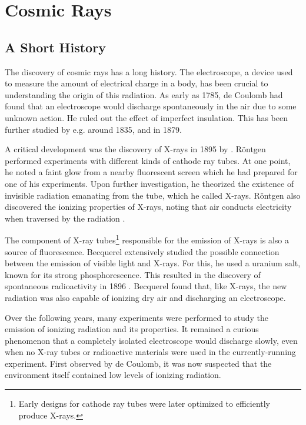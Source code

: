 \chapter{Cosmic Rays}

\section{A Short History}

The discovery of cosmic rays has a long history.  The electroscope, a device
used to measure the amount of electrical charge in a body, has been crucial to
understanding the origin of this radiation.
As early as 1785, de Coulomb \cite{deCoulomb:1785} had found that an electroscope would
discharge spontaneously in the air due to some unknown action.  He
ruled out the effect of imperfect insulation.  This has been further studied by e.g.
\textcite{Faraday:1835} around 1835, and \textcite{Crookes:1879} in 1879.

A critical development was the discovery of X-rays in 1895 by
\textcite{Roentgen:1895}.  Röntgen performed experiments with different kinds of
cathode ray tubes.  At one point, he noted a faint glow from a nearby
fluorescent screen which he had prepared for one of his experiments.
Upon further investigation, he theorized the existence of invisible radiation
emanating from the tube, which he called X-rays.  Röntgen also discovered the
ionizing properties of X-rays, noting that air conducts electricity when
traversed by the radiation \cite{Flakus:1981}.

The component of X-ray tubes\footnote{Early designs for cathode ray tubes were later
optimized to efficiently produce X-rays.} responsible for the emission of X-rays
is also a source of fluorescence.
Becquerel extensively studied the possible connection between the emission of
visible light and X-rays.  For this, he used a uranium salt, known for its
strong phosphorescence.  This resulted in the discovery of spontaneous
radioactivity in 1896 \cite{Becquerel:1896}.  Becquerel found that, like X-rays, the new
radiation was also capable of ionizing dry air and discharging an electroscope.

Over the following years, many experiments were performed to study the emission
of ionizing radiation and its properties.  It remained a curious phenomenon that
a completely isolated electroscope would discharge slowly, even when no
X-ray tubes or radioactive materials were used in the currently-running experiment.
First observed by de Coulomb, it was now suspected that the environment itself
contained low levels of ionizing radiation.


